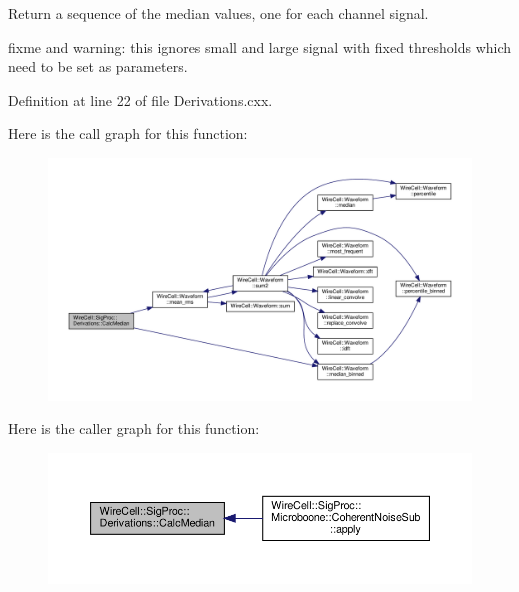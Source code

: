 Return a sequence of the median values, one for each channel signal.

fixme and warning\+: this ignores small and large signal with fixed thresholds which need to be set as parameters. 

Definition at line 22 of file Derivations.\+cxx.

Here is the call graph for this function\+:
\nopagebreak
\begin{figure}[H]
\begin{center}
\leavevmode
\includegraphics[width=350pt]{namespace_wire_cell_1_1_sig_proc_1_1_derivations_a162c77ac9d9ea28303c9a0c843e052a8_cgraph}
\end{center}
\end{figure}
Here is the caller graph for this function\+:
\nopagebreak
\begin{figure}[H]
\begin{center}
\leavevmode
\includegraphics[width=350pt]{namespace_wire_cell_1_1_sig_proc_1_1_derivations_a162c77ac9d9ea28303c9a0c843e052a8_icgraph}
\end{center}
\end{figure}
\mbox{\label{namespace_wire_cell_1_1_sig_proc_1_1_derivations_a3119f257567050bd02427bbcd2cd3a7b}} 
